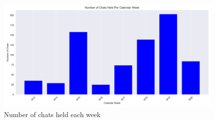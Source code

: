 \begin{figure}[H]
    \centering
    \includegraphics[width=\textwidth]{results/plots/assets/usage-03-number-of-chats-per-calendar-week.png}
    \caption{Number of chats held each week}
    \label{fig:usage_03_number_of_chats_per_calendar_week}
\end{figure}